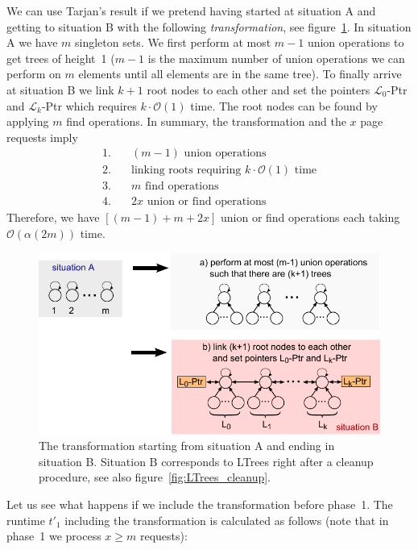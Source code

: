 \documentclass[a4paper,12pt, titlepage]{article}  %
\newcommand{\cl}{\mathcal{L}}   %
\newcommand{\oh}{\mathcal{O}}   %
\begin{document}
We can use Tarjan's result if we pretend having started at situation A and getting to situation B with the following \emph{transformation}, 
see figure~\ref{fig:LTrees_transformation}.
In situation A we have $m$ singleton sets. We first perform at most $m-1$ union operations to get trees of height~1
($m-1$ is the maximum number of union operations we can perform on $m$ elements until all elements are in the same tree). 
To finally arrive at situation B we link $k+1$ root nodes to each other and 
set the pointers $\cl_0$-Ptr and $\cl_k$-Ptr which requires $k \cdot \oh(1)$ time. The root nodes can be found by applying 
$m$ find operations. In summary, the transformation and the $x$ page requests imply
\begin{align*}
1. \quad &(m-1)  \text{ union operations }  \\
2. \quad & \text{linking roots requiring $k \cdot \oh(1)$ time} \\
3. \quad & m \text{ find operations } \\
4. \quad & 2x \text{ union or find operations }
\end{align*}
\noindent Therefore, we have $[(m-1)+m+2x]$ union or find operations each taking 
$\oh(\alpha(2m))$ time.
\begin{figure}[htp]
	\centering
	\includegraphics[scale=1.0]{./figures/LTrees_transformation.pdf}
	\caption{The transformation starting from situation A and ending in situation B. Situation B corresponds to LTrees right after a cleanup procedure, 
                     see also figure~\ref{fig:LTrees_cleanup}.} 
	\label{fig:LTrees_transformation}
\end{figure}

Let us see what happens if we include the transformation before phase~1. 
The runtime $t'_1$ including the transformation is calculated as follows
(note that in phase~1 we process $x \geq m$ requests):
 
\end{document}
